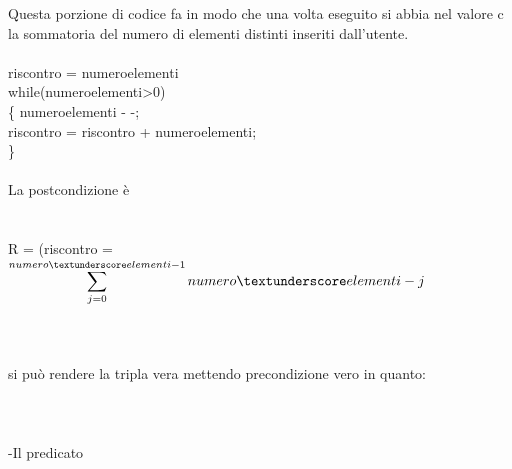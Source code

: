 \documentclass[11pt, a4paper, titlepage, block]{article}
\begin{document}
Questa porzione di codice fa in modo che una volta eseguito si abbia nel valore c la sommatoria del numero di elementi distinti inseriti dall'utente.	
\\
\\
riscontro = numero\textunderscore elementi\\	
while(numero\textunderscore elementi\textgreater 0)\\
\{
numero\textunderscore elementi - -;\\
riscontro = riscontro + numero\textunderscore elementi;\\
\}
\\
\\
La postcondizione \`e 
\\
\\
\\
R = (riscontro = $\displaystyle \sum_{j=0}^{numero\textunderscore elementi-1} numero\textunderscore elementi - j $\\
\\
\\
\\
si pu\`o rendere la tripla vera mettendo precondizione vero  in quanto:\\
\\
\\
\\
 -Il predicato
 
\end{document}
